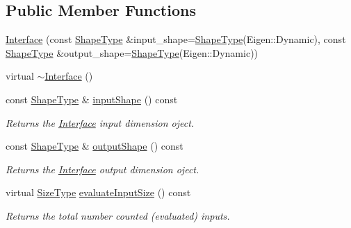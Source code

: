 \subsection*{Public Member Functions}
\begin{DoxyCompactItemize}
\item 
\hyperlink{classffnn_1_1layer_1_1internal_1_1_interface_a8cd5a34202113edec18a64518d67b76f}{Interface} (const \hyperlink{classffnn_1_1layer_1_1internal_1_1_interface_a945709b1d0ea54a51539b80d04485f5f}{Shape\-Type} \&input\-\_\-shape=\hyperlink{classffnn_1_1layer_1_1internal_1_1_interface_a945709b1d0ea54a51539b80d04485f5f}{Shape\-Type}(Eigen\-::\-Dynamic), const \hyperlink{classffnn_1_1layer_1_1internal_1_1_interface_a945709b1d0ea54a51539b80d04485f5f}{Shape\-Type} \&output\-\_\-shape=\hyperlink{classffnn_1_1layer_1_1internal_1_1_interface_a945709b1d0ea54a51539b80d04485f5f}{Shape\-Type}(Eigen\-::\-Dynamic))
\item 
virtual \hyperlink{classffnn_1_1layer_1_1internal_1_1_interface_a87499fd55b6612a35a1af5b13b851a55}{$\sim$\-Interface} ()
\item 
const \hyperlink{classffnn_1_1layer_1_1internal_1_1_interface_a945709b1d0ea54a51539b80d04485f5f}{Shape\-Type} \& \hyperlink{classffnn_1_1layer_1_1internal_1_1_interface_ac1fdda72086fe9c9bb05c2211fc9f050}{input\-Shape} () const 
\begin{DoxyCompactList}\small\item\em Returns the \hyperlink{classffnn_1_1layer_1_1internal_1_1_interface}{Interface} input dimension oject. \end{DoxyCompactList}\item 
const \hyperlink{classffnn_1_1layer_1_1internal_1_1_interface_a945709b1d0ea54a51539b80d04485f5f}{Shape\-Type} \& \hyperlink{classffnn_1_1layer_1_1internal_1_1_interface_a05233a4b8e763ea17c58f45c480add35}{output\-Shape} () const 
\begin{DoxyCompactList}\small\item\em Returns the \hyperlink{classffnn_1_1layer_1_1internal_1_1_interface}{Interface} output dimension oject. \end{DoxyCompactList}\item 
virtual \hyperlink{classffnn_1_1layer_1_1internal_1_1_interface_af0567642f60c65b5e87067226a54174b}{Size\-Type} \hyperlink{classffnn_1_1layer_1_1internal_1_1_interface_aae590ebe90408887805743c5e364dd45}{evaluate\-Input\-Size} () const 
\begin{DoxyCompactList}\small\item\em Returns the total number counted (evaluated) inputs. \end{DoxyCompactList}\item 

\end{DoxyCompactItemize}
